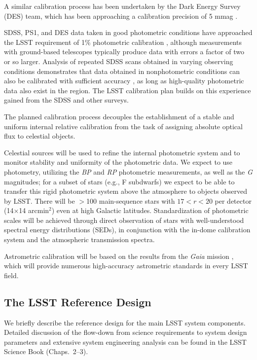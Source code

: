 A similar calibration process has been undertaken by the Dark Energy
Survey (DES) team, which has been approaching a calibration
precision of 5 mmag \citep{2018AJ....155...41B}.

SDSS, PS1, and DES data
taken in good photometric conditions have approached the LSST
requirement of 1\% photometric calibration
\citep{2008ApJ...674.1217P,2012ApJ...756..158S,2018AJ....155...41B}, although measurements with ground-based telescopes
typically produce data with errors a factor of two or so larger. Analysis of
repeated SDSS scans obtained in varying observing conditions demonstrates that data
obtained in
nonphotometric conditions can also be calibrated with
sufficient accuracy \citep{2007AJ....134..973I}, as long as high-quality
photometric data also exist in the region.
The LSST calibration plan builds on this experience gained from the SDSS and other surveys.

The planned calibration process decouples the establishment of a stable and uniform internal
relative calibration from the task of assigning absolute optical flux to
celestial objects.

Celestial sources will be used to refine the internal photometric system and
to monitor stability and uniformity of the photometric data. We expect to use \citet{2016A&A...595A...2G} photometry, utilizing
the \textit{BP} and \textit{RP} photometric measurements, as well as the \textit{G} magnitudes; for a subset
of stars (e.g., F subdwarfs) we expect to be able to transfer this rigid photometric system above
the atmosphere to objects observed by LSST.
There will be
$>$100 main-sequence stars with $17<r<20$ per detector (14$\times$14 arcmin$^2$)
even at high Galactic latitudes. Standardization of photometric scales will be
achieved through direct observation of stars with well-understood spectral
energy distributions (SEDs), in conjunction with the in-dome calibration system and the atmospheric transmission spectra.

Astrometric calibration will be based on the results from the \textit{Gaia} mission \citep{2018A&A...616A...2L}, which will provide
numerous high-accuracy astrometric standards in every LSST field.

\subsection{The LSST  Reference Design}

We briefly describe the reference design for the main LSST system components.
Detailed discussion of the flow-down from science requirements to system
design parameters and extensive system engineering analysis can be
found in the LSST Science Book (Chaps.~2--3).

